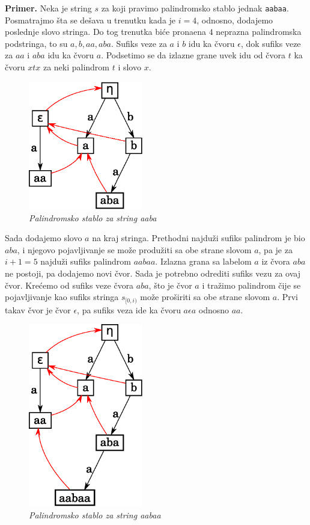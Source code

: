 \noindent \textbf{Primer.} Neka je string $s$ za koji pravimo palindromsko stablo jednak \texttt{aabaa}. Posmatrajmo \v sta se de\v sava u trenutku kada je $i=4$, odnosno, dodajemo poslednje slovo stringa. Do tog trenutka bi\' ce prona\dj ena $4$ neprazna palindromska podstringa, to su $a,b,aa,aba$. Sufiks veze za $a$ i $b$ idu ka \v cvoru $\epsilon$, dok sufiks veze za $aa$ i $aba$ idu ka \v cvoru $a$. Podsetimo se da izlazne grane uvek idu od \v cvora $t$ ka \v cvoru $xtx$ za neki palindrom $t$ i slovo $x$.

\begin{figure}[H]
    \centering
    \includegraphics[width=50mm]{../img/eertree1.eps}
    \caption*{\textit{Palindromsko stablo za string aaba}}
\end{figure}

Sada dodajemo slovo $a$ na kraj stringa. Prethodni najdu\v zi sufiks palindrom je bio $aba$, i njegovo pojavljivanje se mo\v ze produ\v ziti sa obe strane slovom $a$, pa je za $i+1=5$ najdu\v zi sufiks palindrom $aabaa$. Izlazna grana sa labelom $a$ iz \v cvora $aba$ ne postoji, pa dodajemo novi \v cvor. Sada je potrebno odrediti sufiks vezu za ovaj \v cvor. Kre\' cemo od sufiks veze \v cvora $aba$, \v sto je \v cvor $a$ i tra\v zimo palindrom \v cije se pojavljivanje kao sufiks stringa $s_{[0,i)}$ mo\v ze pro\v siriti sa obe strane slovom $a$. Prvi takav \v cvor je \v cvor $\epsilon$, pa sufiks veza ide ka \v cvoru $a\epsilon a$ odnosno $aa$.

\begin{figure}[H]
    \centering
    \includegraphics[width=50mm]{../img/eertree2.eps}
    \caption*{\textit{Palindromsko stablo za string aabaa}}
\end{figure}

